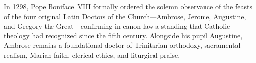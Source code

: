 In 1298, Pope Boniface~VIII formally ordered the solemn observance of the feasts of the four original Latin Doctors of the Church---Ambrose, Jerome, Augustine, and Gregory the Great---confirming in canon law a standing that Catholic theology had recognized since the fifth century. Alongside his pupil Augustine, Ambrose remains a foundational doctor of Trinitarian orthodoxy, sacramental realism, Marian faith, clerical ethics, and liturgical praise.

